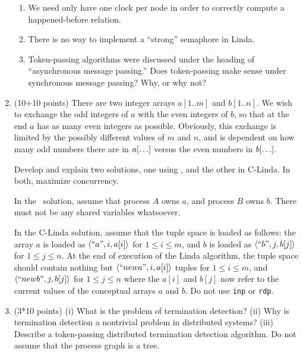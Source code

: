 \begin{enumerate}
\begin{enumerate}
\item
We need only have one clock per node in order to correctly compute a
happened-before relation.

\item
There is no way to implement a ``strong'' semaphore in Linda.

\item Token-passing algorithms were discussed under the heading 
of ``asynchronous message passing.''  Does token-passing make sense
under synchronous message passing?  Why, or why not?


\end{enumerate}

\item (10+10 points)
There are two integer arrays $a[1..m]$ and $b[1..n]$.  We wish to
exchange the odd integers of $a$ with the even integers of $b$, so
that at the end $a$ has as many even integers as possible.  Obviously,
this exchange is limited by the possibly different values of $m$ and
$n$, and is dependent on how many odd numbers there are in
$a[\ldots]$ versus the even numbers in $b[\ldots]$.

Develop and explain two solutions, one using \CSP, and the other in C-Linda.  In both, maximize
concurrency.

In the \CSP\ solution,  assume that process $A$ owns $a$, and process
$B$ owns $b$.  There must not be any shared
variables whatsoever.

In the C-Linda solution, assume that the tuple space is
loaded as follows: the array $a$ is loaded as $\langle ``a", i, a[i]\rangle$
for $1 \leq i \leq m$, and $b$ is loaded as $\langle ``b", j, b[j]\rangle$
for $1 \leq j \leq n$.  At the end of execution of
the Linda algorithm, the tuple space should contain nothing but
$\langle ``newa", i, a[i]\rangle$ tuples
for $1 \leq i \leq m$, and $\langle ``newb", j, b[j]\rangle$
for $1 \leq j \leq n$ where the $a[i]$ and $b[j]$ now refer
to the current values of the conceptual arrays $a$ and $b$.
Do not use {\tt inp} or {\tt rdp}.


\item (3*10 points)
(i) What is the problem of termination detection?  (ii) Why is
termination detection a nontrivial problem in distributed systems?
(iii) Describe a token-passing distributed termination detection
algorithm.  Do not assume that the process graph is a tree.
\end{enumerate}

